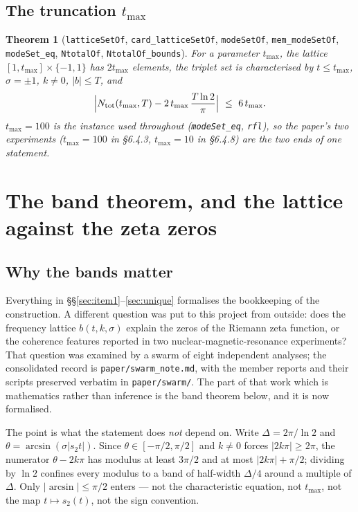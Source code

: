 \documentclass[11pt,a4paper]{article}
\newcommand{\lb}{\_\allowbreak}
\newcommand{\code}[1]{\texttt{#1}}
\newtheorem{theorem}{Theorem}[section]
\theoremstyle{definition}
\theoremstyle{remark}
\begin{document}
\subsection{The truncation $t_{\max}$}

\begin{theorem}[\code{latticeSetOf}, \code{card\lb latticeSetOf}, \code{modeSetOf},
\code{mem\lb modeSetOf}, \code{modeSet\lb eq}, \code{NtotalOf}, \code{NtotalOf\lb bounds}]
For a parameter $t_{\max}$, the lattice $[1,t_{\max}]\times\{-1,1\}$ has $2t_{\max}$ elements,
the triplet set is characterised by $t\le t_{\max}$, $\sigma=\pm1$, $k\ne0$, $|b|\le T$, and
\[
  \Bigl|N_{\mathrm{tot}}(t_{\max},T) - 2\,t_{\max}\,\frac{T\ln2}{\pi}\Bigr|\ \le\ 6\,t_{\max}.
\]
$t_{\max}=100$ is the instance used throughout (\code{modeSet\lb eq}, \code{rfl}), so the paper's
two experiments ($t_{\max}=100$ in \S6.4.3, $t_{\max}=10$ in \S6.4.8) are the two ends of one
statement.
\end{theorem}


\section{The band theorem, and the lattice against the zeta zeros}\label{sec:band}

\subsection{Why the bands matter}

Everything in \S\S\ref{sec:item1}--\ref{sec:unique} formalises the bookkeeping of the construction.
A different question was put to this project from outside: does the frequency lattice
$b(t,k,\sigma)$ explain the zeros of the Riemann zeta function, or the coherence features reported in
two nuclear-magnetic-resonance experiments? That question was examined by a swarm of eight
independent analyses; the consolidated record is \code{paper/swarm\lb note.md}, with the member
reports and their scripts preserved verbatim in \code{paper/swarm/}. The part of that work which is
mathematics rather than inference is the band theorem below, and it is now formalised.

The point is what the statement does \emph{not} depend on. Write $\Delta = 2\pi/\ln 2$ and
$\theta = \arcsin(\sigma|s_2 t|)$. Since $\theta \in [-\pi/2,\pi/2]$ and $k \ne 0$ forces
$|2k\pi| \ge 2\pi$, the numerator $\theta - 2k\pi$ has modulus at least $3\pi/2$ and at most
$|2k\pi| + \pi/2$; dividing by $\ln 2$ confines every modulus to a band of half-width $\Delta/4$
around a multiple of $\Delta$. Only $|\arcsin| \le \pi/2$ enters --- not the characteristic equation,
not $t_{\max}$, not the map $t \mapsto s_2(t)$, not the sign convention.
\end{document}
